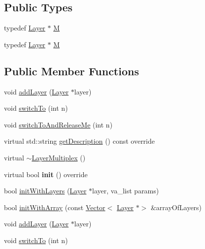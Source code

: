 \subsection*{Public Types}
\begin{DoxyCompactItemize}
\item 
typedef \hyperlink{classLayer}{Layer} $\ast$ \hyperlink{classLayerMultiplex_a47ea9ae27cb9c95490a017ab01952487}{M}
\item 
typedef \hyperlink{classLayer}{Layer} $\ast$ \hyperlink{classLayerMultiplex_a47ea9ae27cb9c95490a017ab01952487}{M}
\end{DoxyCompactItemize}
\subsection*{Public Member Functions}
\begin{DoxyCompactItemize}
\item 
void \hyperlink{classLayerMultiplex_a346cf395698a492b89e76f49cb8bc599}{add\+Layer} (\hyperlink{classLayer}{Layer} $\ast$layer)
\item 
void \hyperlink{classLayerMultiplex_a2c9ab67b2b94e447a92d94fb28d45f89}{switch\+To} (int n)
\item 
void \hyperlink{classLayerMultiplex_a50d274d3addfaf7140a48da909a60ea8}{switch\+To\+And\+Release\+Me} (int n)
\item 
virtual std\+::string \hyperlink{classLayerMultiplex_a60e44b51edd0e10a3601bf5e5094c30d}{get\+Description} () const override
\item 
virtual \hyperlink{classLayerMultiplex_a9867834efbc7a54d948ccc909c2da3b5}{$\sim$\+Layer\+Multiplex} ()
\item 
\mbox{\label{classLayerMultiplex_a88042809b111532fce94f7f71c7638fe}} 
virtual bool {\bfseries init} () override
\item 
bool \hyperlink{classLayerMultiplex_a9ad4fc1963d1a2a8fd1a41518e2c469b}{init\+With\+Layers} (\hyperlink{classLayer}{Layer} $\ast$layer, va\+\_\+list params)
\item 
bool \hyperlink{classLayerMultiplex_a36ddbf3e48d1d5176ca4ed0be4fff2b2}{init\+With\+Array} (const \hyperlink{classVector}{Vector}$<$ \hyperlink{classLayer}{Layer} $\ast$$>$ \&array\+Of\+Layers)
\item 
void \hyperlink{classLayerMultiplex_a346cf395698a492b89e76f49cb8bc599}{add\+Layer} (\hyperlink{classLayer}{Layer} $\ast$layer)
\item 
void \hyperlink{classLayerMultiplex_a2c9ab67b2b94e447a92d94fb28d45f89}{switch\+To} (int n)
$$
\end{DoxyCompactItemize}
